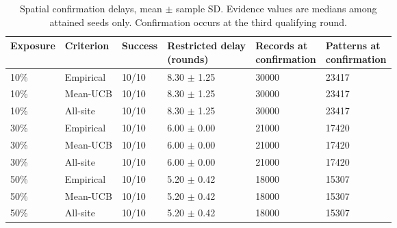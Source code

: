 \begin{table}[t]
\centering
\small
\setlength{\tabcolsep}{3pt}
\caption{Spatial confirmation delays, mean $\pm$ sample SD. Evidence values are medians among attained seeds only. Confirmation occurs at the third qualifying round.}
\label{tab:spatial_confirmation}
\begin{tabular}{llllll}
\hline
Exposure & Criterion & Success & \shortstack{Restricted delay\\(rounds)} & \shortstack{Records at\\confirmation} & \shortstack{Patterns at\\confirmation} \\
\hline
10\% & Empirical & 10/10 & 8.30 $\pm$ 1.25 & 30000 & 23417 \\
10\% & Mean-UCB & 10/10 & 8.30 $\pm$ 1.25 & 30000 & 23417 \\
10\% & All-site & 10/10 & 8.30 $\pm$ 1.25 & 30000 & 23417 \\
30\% & Empirical & 10/10 & 6.00 $\pm$ 0.00 & 21000 & 17420 \\
30\% & Mean-UCB & 10/10 & 6.00 $\pm$ 0.00 & 21000 & 17420 \\
30\% & All-site & 10/10 & 6.00 $\pm$ 0.00 & 21000 & 17420 \\
50\% & Empirical & 10/10 & 5.20 $\pm$ 0.42 & 18000 & 15307 \\
50\% & Mean-UCB & 10/10 & 5.20 $\pm$ 0.42 & 18000 & 15307 \\
50\% & All-site & 10/10 & 5.20 $\pm$ 0.42 & 18000 & 15307 \\
\hline
\end{tabular}
\end{table}

